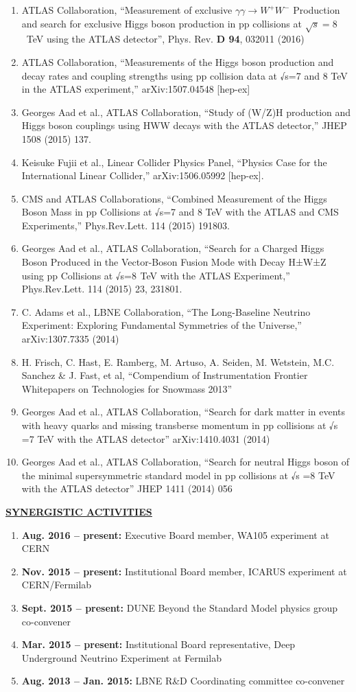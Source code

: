\begin{enumerate}[noitemsep]
\item ATLAS Collaboration, “Measurement of exclusive $\gamma\gamma\rightarrow W^{+}W^{-}$ Production and search for exclusive Higgs boson production in pp collisions at $\sqrt{s}=8$~TeV using the ATLAS detector”, Phys. Rev. {\bf D 94}, 032011 (2016)
\item ATLAS Collaboration, “Measurements of the Higgs boson production and decay rates and coupling strengths using pp collision data at √s=7 and 8 TeV in the ATLAS experiment,” arXiv:1507.04548 [hep-ex]
\item Georges Aad et al., ATLAS Collaboration, “Study of (W/Z)H production and Higgs boson couplings using HWW decays with the ATLAS detector,” JHEP 1508 (2015) 137.
\item Keisuke Fujii et al., Linear Collider Physics Panel, “Physics Case for the International Linear Collider,” arXiv:1506.05992 [hep-ex].
\item CMS and ATLAS Collaborations, “Combined Measurement of the Higgs Boson Mass in pp Collisions at √s=7 and 8 TeV with the ATLAS and CMS Experiments,” Phys.Rev.Lett. 114 (2015) 191803.
\item Georges Aad et al., ATLAS Collaboration, “Search for a Charged Higgs Boson Produced in the Vector-Boson Fusion Mode with Decay H±W±Z using pp Collisions at √s=8  TeV with the ATLAS Experiment,” Phys.Rev.Lett. 114 (2015) 23, 231801.
\item C. Adams et al., LBNE Collaboration, “The Long-Baseline Neutrino Experiment: Exploring Fundamental Symmetries of the Universe,” arXiv:1307.7335 (2014)
\item H. Frisch, C. Hast, E. Ramberg, M. Artuso, A. Seiden, M. Wetstein, M.C. Sanchez \& J. Fast, et al, “Compendium of Instrumentation Frontier Whitepapers on Technologies for Snowmass 2013” 
\item Georges Aad et al., ATLAS Collaboration, “Search for dark matter in events with heavy quarks and missing transberse momentum in pp collisions at √s =7 TeV with the ATLAS detector” arXiv:1410.4031 (2014)
\item Georges Aad et al., ATLAS Collaboration, “Search for neutral Higgs boson of the minimal supersymmetric standard model in pp collisions at √s =8 TeV with the ATLAS detector” JHEP 1411 (2014) 056
\end{enumerate}
%
{\underline{\underline{{\bf SYNERGISTIC ACTIVITIES}}}}
\begin{enumerate}[noitemsep]
\item {\bf Aug. 2016 – present:} Executive Board member, WA105 experiment at CERN
\item {\bf Nov. 2015 – present:} Institutional Board member, ICARUS experiment at CERN/Fermilab
\item {\bf Sept. 2015 – present:} DUNE Beyond the Standard Model physics group co-convener
\item {\bf Mar. 2015 – present:} Institutional Board representative, Deep Underground Neutrino Experiment at Fermilab
\item {\bf Aug. 2013 – Jan. 2015:} LBNE R\&D Coordinating committee co-convener
\end{enumerate}
